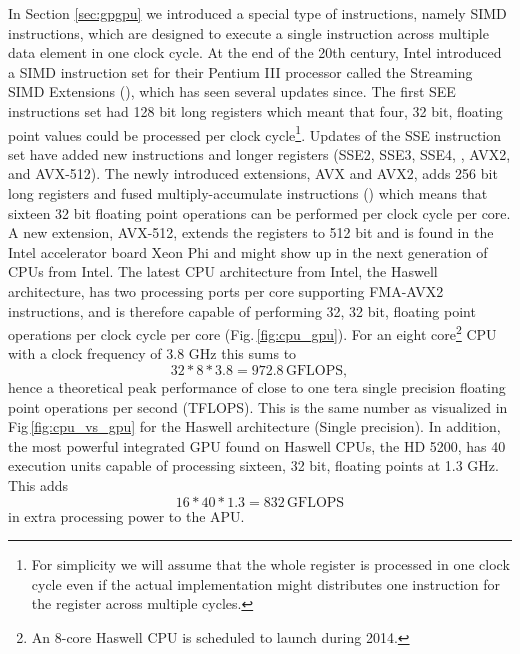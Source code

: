In Section \ref{sec:gpgpu} we introduced a special type of instructions, namely SIMD instructions, which are designed to execute a single instruction across multiple data element in one clock cycle. At the end of the 20th century, Intel introduced a SIMD instruction set for their Pentium III processor called the Streaming SIMD Extensions (), which has seen several updates since. The first SEE instructions set had 128 bit long registers which meant that four, 32 bit, floating point values could be processed per clock cycle\footnote{For simplicity we will assume that the whole register is processed in one clock cycle even if the actual implementation might distributes one instruction for the register across multiple cycles.}. Updates of the SSE instruction set have added new instructions and longer registers (SSE2, SSE3, SSE4, , AVX2, and AVX-512). The newly introduced extensions, AVX and AVX2, adds 256 bit long registers and fused multiply-accumulate instructions ()  which means that sixteen 32 bit floating point operations can be performed per clock cycle per core. A new extension, AVX-512, extends the registers to 512 bit and is found in the Intel accelerator board  Xeon Phi and might show up in the next generation of CPUs from Intel. The latest CPU architecture from Intel, the Haswell architecture, has two processing ports per core supporting FMA-AVX2 instructions, and is therefore capable of performing 32, 32 bit, floating point operations per clock cycle per core (Fig.\,\ref{fig:cpu_gpu}). For an eight core\footnote{An 8-core Haswell CPU is scheduled to launch during 2014.} CPU with a clock frequency of 3.8 GHz this sums to 
\begin{equation}
32*8*3.8 = 972.8\,\text{GFLOPS},
\end{equation}
hence a theoretical peak performance of close to one tera single precision floating point operations per second (TFLOPS). This is the same number as visualized in Fig\,\ref{fig:cpu_vs_gpu} for the Haswell architecture (Single precision). In addition, the most powerful integrated GPU found on Haswell CPUs, the HD 5200, has 40 execution units capable of processing sixteen, 32 bit, floating points at 1.3 GHz. This adds
\begin{equation}
16*40*1.3 = 832\,\text{GFLOPS}
\end{equation}
in extra processing power to the APU.

